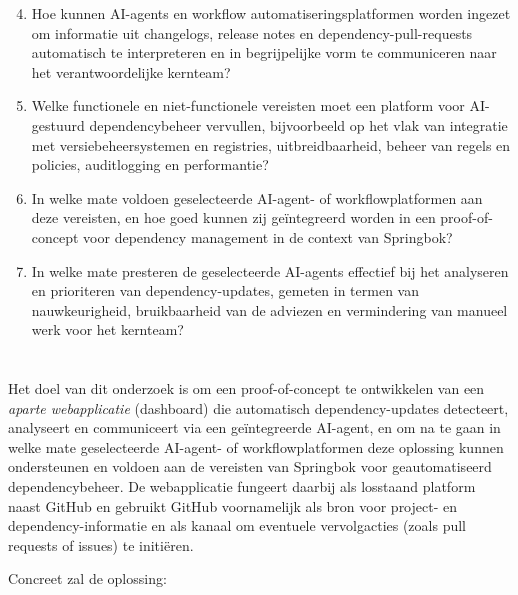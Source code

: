 \begin{enumerate}
  \setcounter{enumi}{3}
  \item Hoe kunnen AI-agents en workflow automatiseringsplatformen worden ingezet om informatie uit changelogs, release notes en dependency-pull-requests automatisch te interpreteren en in begrijpelijke vorm te communiceren naar het verantwoordelijke kernteam?
  \item Welke functionele en niet-functionele vereisten moet een platform voor AI-gestuurd dependencybeheer vervullen, bijvoorbeeld op het vlak van integratie met versiebeheersystemen en registries, uitbreidbaarheid, beheer van regels en policies, auditlogging en performantie?
  \item In welke mate voldoen geselecteerde AI-agent- of workflowplatformen aan deze vereisten, en hoe goed kunnen zij geïntegreerd worden in een proof-of-concept voor dependency management in de context van Springbok?
  \item In welke mate presteren de geselecteerde AI-agents effectief bij het analyseren en prioriteren van dependency-updates, gemeten in termen van nauwkeurigheid, bruikbaarheid van de adviezen en vermindering van manueel werk voor het kernteam?
\end{enumerate}

\section{}%
\label{sec:onderzoeksdoelstelling}

Het doel van dit onderzoek is om een proof-of-concept te ontwikkelen van een \emph{aparte webapplicatie} (dashboard) die automatisch dependency-updates detecteert, analyseert en communiceert via een geïntegreerde AI-agent, en om na te gaan in welke mate geselecteerde AI-agent- of workflowplatformen deze oplossing kunnen ondersteunen en voldoen aan de vereisten van Springbok voor geautomatiseerd dependencybeheer. De webapplicatie fungeert daarbij als losstaand platform naast GitHub en gebruikt GitHub voornamelijk als bron voor project- en dependency-informatie en als kanaal om eventuele vervolgacties (zoals pull requests of issues) te initiëren.

Concreet zal de oplossing:

